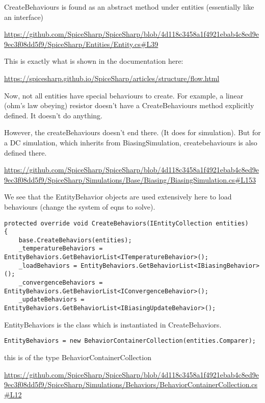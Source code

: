 \documentclass[12pt]{article}
\renewcommand{\_}{\kern-1.5pt\textunderscore\kern-1.5pt}
\begin{document}
CreateBehaviours is found as an abstract method under entities (essentially like an interface) 

\url{https://github.com/SpiceSharp/SpiceSharp/blob/4d118c3458a1f4921ebab4c8ed9e9ec3f08dd5f9/SpiceSharp/Entities/Entity.cs#L39}


This is exactly what is shown in the documentation here:

\url{https://spicesharp.github.io/SpiceSharp/articles/structure/flow.html}

Now, not all entities have special behaviours to create. For example, a linear (ohm's law obeying) resistor doesn't have a CreateBehaviours method explicitly defined. It doesn't do anything. 

However, the createBehaviours doesn't end there. (It does for simulation). But for a DC simulation, which inherits from BiasingSimulation, createbehaviours is also defined there.

\url{https://github.com/SpiceSharp/SpiceSharp/blob/4d118c3458a1f4921ebab4c8ed9e9ec3f08dd5f9/SpiceSharp/Simulations/Base/Biasing/BiasingSimulation.cs#L153}

We see that the EntityBehavior objects are used extensively here to load behaviours (change the system of eqns to solve).



\begin{verbatim}
protected override void CreateBehaviors(IEntityCollection entities)
{
	base.CreateBehaviors(entities);
	_temperatureBehaviors = EntityBehaviors.GetBehaviorList<ITemperatureBehavior>();
	_loadBehaviors = EntityBehaviors.GetBehaviorList<IBiasingBehavior>();
	_convergenceBehaviors = EntityBehaviors.GetBehaviorList<IConvergenceBehavior>();
	_updateBehaviors = EntityBehaviors.GetBehaviorList<IBiasingUpdateBehavior>();
\end{verbatim}

EntityBehaviors is the class which is instantiated in CreateBehaviors.

\begin{verbatim}
EntityBehaviors = new BehaviorContainerCollection(entities.Comparer);
\end{verbatim}



this is of the type BehaviorContainerCollection 

\url{https://github.com/SpiceSharp/SpiceSharp/blob/4d118c3458a1f4921ebab4c8ed9e9ec3f08dd5f9/SpiceSharp/Simulations/Behaviors/BehaviorContainerCollection.cs#L12}
\end{document}
